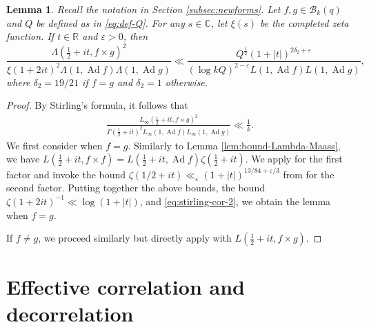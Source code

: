\documentclass[12pt,reqno]{amsart}
\newtheorem{lem}[thm]{Lemma}
\theoremstyle{remark}
\DeclareMathOperator{\ad}{Ad}
\numberwithin{equation}{section}
\begin{document}
    \begin{lem}\label{lem:bound-Lambda-Eis}
    Recall the notation in Section \ref{subsec:newforms}. Let $f,g \in \mathcal{B}_k(q)$ and $Q$ be defined as in \eqref{eq:def-Q}. For any $s \in \mathbb{C}$, let $\xi(s)$ be the completed zeta function. If $t \in \mathbb{R}$ and $\varepsilon > 0$, then
    \begin{equation*}
        \frac{\Lambda(\frac{1}{2}+it, f \times g)^2}{\xi(1+2it)^2\Lambda(1, \ad f)\Lambda(1, \ad g) } \ll  \frac{Q^{\frac{1}{2}}(1+|t|)^{2\delta_2+\varepsilon}}{(\log kQ)^{2-\varepsilon}L(1,\ad f)L(1,\ad g)},
    \end{equation*}
    where $\delta_2 = 19/21$ if $f=g$ and $\delta_2 = 1$ otherwise. 
    \end{lem}
    \begin{proof}
    By Stirling's formula,  it follows that 
    \begin{equation}\label{eq:stirling-cor-2}
        \begin{aligned}
        \frac{L_\infty(\tfrac{1}{2} +it, f \times g)^2}{\Gamma(\frac{1}{2}+it)^2 L_\infty(1,\ad f)L_\infty(1,\ad g)} 
        \ll \frac{1}{k}.
        \end{aligned}
    \end{equation}
   We first consider when $f=g$. Similarly to Lemma \ref{lem:bound-Lambda-Maass}, we have $L(\tfrac{1}{2}+it, f \times f) = L(\tfrac{1}{2}+it, \ad f)\zeta(\tfrac{1}{2}+it)$. We apply \cite[Theorem 1]{S} for the first factor and invoke the bound  $\zeta(1/2+it) \ll_{\varepsilon} (1+|t|)^{13/84+\varepsilon/3}$ from \cite{BJ} for the second factor. Putting together the above bounds, the bound $\zeta(1+2it)^{-1} \ll \log(1+|t|)$, and \eqref{eq:stirling-cor-2}, we obtain the lemma when $f=g$.   
    
   If $f\neq g$, we proceed similarly but directly apply \cite[Theorem 1]{S} with $L(\frac{1}{2}+it, f \times g)$.
    \end{proof}


	
	
	\section{Effective correlation and decorrelation}\label{sec:correlation}
\end{document}
